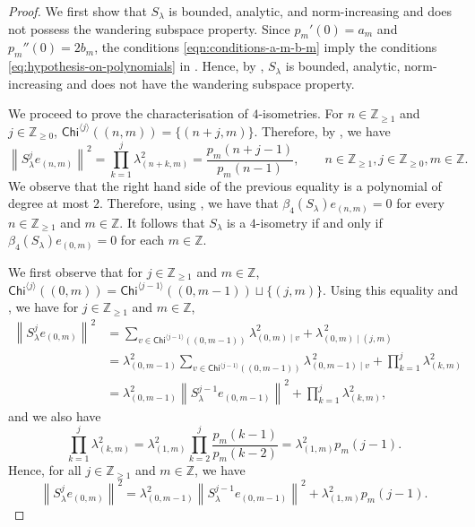\documentclass[11pt, reqno, a4paper]{amsart}
\theoremstyle{definition}
\newcommand{\norm}[1]{\left\lVert #1 \right\rVert}
\renewcommand{\ge}{\geqslant}
\newcommand{\Z}{\mathbb Z}
\newcommand{\Chi}{\mathsf{Chi}}
\numberwithin{equation}{section}
\begin{document}
    \begin{proof}
        We first show that $S_{\lambda}$ is bounded, analytic, and norm-increasing and does not possess the wandering subspace property. Since $p_m ' (0) = a_m$ and $p_m '' (0) = 2 b_m$, the conditions \eqref{eqn:conditions-a-m-b-m} imply the conditions \eqref{eq:hypothesis-on-polynomials} in . Hence, by , $S_\lambda$ is bounded, analytic, norm-increasing and does not have the wandering subspace property.
    
        We proceed to prove the characterisation of $4$-isometries. For $n \in \Z_{\ge 1}$ and $j \in \Z_{\ge 0}$, $\Chi ^{\langle j \rangle} \left( (n,m) \right) = \{ (n+j, m) \}$. Therefore, by , we have
        \begin{equation*}
            \norm{S_{\lambda}^{j} e_{(n,m)}} ^{2} = \prod_{k=1}^{j} \lambda_{(n+k, m)} ^{2} = \frac{p_m (n+j-1)}{p_m (n-1)}, \qquad n \in \Z_{\ge 1}, j \in \Z_{\ge 0}, m \in \Z.
        \end{equation*}
        We observe that the right hand side of the previous equality is a polynomial of degree at most $2$. Therefore, using , we have that $\beta_4 (S_{\lambda}) e_{(n,m)} = 0$ for every $n \in \Z_{\ge1}$ and $m \in \Z$. It follows that $S_\lambda$ is a $4$-isometry if and only if $\beta_4 (S_{\lambda}) e_{(0,m)} = 0$ for each $m \in \Z$.
    
        We first observe that for $j \in \Z_{\ge 1}$ and $m \in \Z$, $\Chi^{\langle j\rangle}((0,m)) = \Chi^{\langle j-1\rangle}((0,m-1)) \sqcup\{(j,m)\}.$ Using this equality and , we have for $j \in \Z_{\ge 1}$ and $m \in \Z$,
            \begin{equation*}
                \begin{aligned}
                \norm{S_\lambda^j e_{(0,m)}}^2 &= \sum_{v\in\Chi^{\langle j-1\rangle}((0,m-1))} \lambda_{(0,m)\mid v}^{2} +\lambda_{(0,m)\mid(j,m)}^{\,2} \\
                &= \lambda_{(0,m-1)}^2 \sum_{v\in\Chi^{\langle j-1\rangle}((0,m-1))} \lambda_{(0,m-1)\mid v}^{\,2} + \prod_{k=1}^{j}\lambda_{(k,m)}^2 \\
                &= \lambda_{(0,m-1)}^2 \norm{S_\lambda^{j-1}e_{(0,m-1)}}^2 + \prod_{k=1}^{j}\lambda_{(k,m)}^2,
                \end{aligned}
            \end{equation*}
        and we also have
            \begin{equation*}
            \prod_{k=1}^{j}\lambda_{(k,m)}^2 = \lambda_{(1,m)}^2 \prod_{k=2}^{j}\frac{p_m(k-1)}{p_m(k-2)} = \lambda_{(1,m)}^2p_m(j-1).
            \end{equation*}
        Hence, for all $j \in \Z_{\ge 1}$ and $m \in \Z$, we have
        \begin{equation}
            \norm{S_\lambda^j e_{(0,m)}}^2 = \lambda_{(0,m-1)}^2 \norm{S_\lambda^{j-1}e_{(0,m-1)}}^2 + \lambda_{(1,m)}^2p_m(j-1).
            \label{eq:branch-rec}
        \end{equation}
    

\end{proof}
\end{document}
